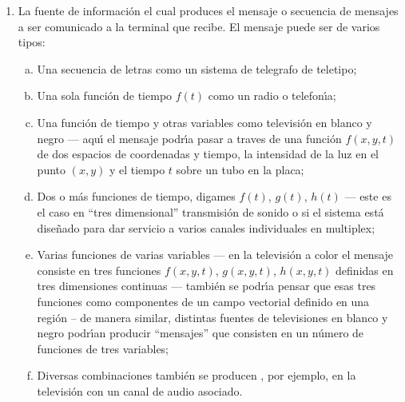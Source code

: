 \begin{enumerate}
\item{La fuente de informaci\'{o}n el cual produces el mensaje o secuencia de
  mensajes a ser comunicado a la terminal que recibe. El mensaje puede
  ser de varios tipos:
  \begin{enumerate}[(a)]
  \item{Una secuencia de letras como un sistema de
    telegrafo de teletipo;}
  \item{Una sola funci\'{o}n de tiempo $f(t)$ como
    un radio o telefon\'{\i}a;}
  \item{Una funci\'{o}n de tiempo y otras
    variables como televisi\'{o}n en blanco y negro --- aqu\'{\i} el
    mensaje podr\'{\i}a pasar a traves de una funci\'{o}n $f(x,y,t)$ de dos
    espacios de coordenadas y tiempo, la intensidad de la luz en el punto
    $(x, y)$ y el tiempo $t$ sobre un tubo en la placa;}
  \item{Dos o m\'{a}s funciones de tiempo, digames $f(t)$, $g(t)$,
    $h(t)$ --- este es el caso en ``tres dimensional'' transmisi\'{o}n
    de sonido o si el sistema est\'{a} dise\~{n}ado para dar servicio a
    varios canales individuales en multiplex;}
  \item{Varias funciones de varias variables --- en la televisi\'{o}n
    a color el mensaje consiste en tres funciones $f(x,y,t)$,
    $g(x,y,t)$, $h(x,y,t)$ definidas en tres dimensiones continuas ---
    tambi\'{e}n se podr\'{\i}a pensar que esas tres funciones como
    componentes de un campo vectorial definido en una regi\'{o}n -- de
    manera similar, distintas fuentes de televisiones en blanco y
    negro podr\'{\i}an producir ``mensajes'' que consisten en un
    n\'{u}mero de funciones de tres variables;}
  \item{Diversas combinaciones tambi\'{e}n se producen , por ejemplo, en la
    televisi\'{o}n con un canal de audio asociado.}
\end{enumerate}}


\end{enumerate}
